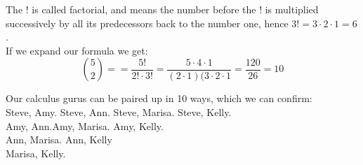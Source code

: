 \documentclass{article}
\begin{document}
The ! is called factorial, and means the number before the ! is multiplied successively by all its predecessors back to the number one, hence $3! = 3 \cdot 2 \cdot 1 = 6$.
\\ If we expand our formula we get:
\vspace{3 mm}
\[
 \binom{5}{2}==\frac{5!}{2! \cdot 3!} =\frac{5 \cdot 4 \cdot 1}{(2 \cdot 1)(3 \cdot 2 \cdot 1}=\frac {120}{26} = 10
\]
\vspace{5 mm}
\begin{center} Our calculus gurus can be paired up in 10 ways, which we can confirm:\\

\vspace{5 mm}
 \quad Steve, Amy. \quad Steve, Ann. \quad Steve, Marisa. \quad Steve, Kelly.\\ 
\vspace{2 mm}
\quad Amy, Ann.\quad Amy, Marisa. \quad Amy, Kelly.\\
\vspace{2 mm}
\quad  Ann, Marisa. \quad Ann, Kelly \\
\vspace{2 mm}
 \quad  Marisa, Kelly.\\ 
  
 \end{center}
 
 \pagebreak
\end{document}

